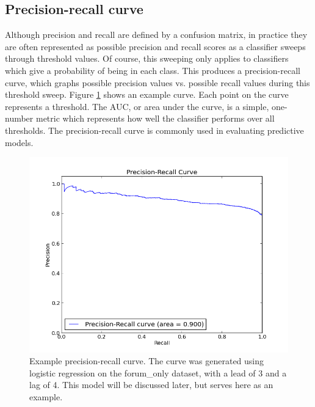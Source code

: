\subsection{Precision-recall curve}
Although precision and recall are defined by a confusion matrix, in practice they are often represented as possible precision and recall scores as a classifier sweeps through threshold values. Of course, this sweeping only applies to classifiers which give a probability of being in each class. This produces a precision-recall curve, which graphs possible precision values vs. possible recall values during this threshold sweep. Figure \ref{fig:example_precision_recall} shows an example curve. Each point on the curve represents a threshold. The AUC, or area under the curve, is a simple, one-number metric which represents how well the classifier performs over all thresholds. The precision-recall curve is commonly used in evaluating predictive models.

\begin{figure}[ht!]
  \caption{Example precision-recall curve. The curve was generated using logistic regression on the forum\_only dataset, with a lead of 3 and a lag of 4. This model will be discussed later, but serves here as an example.}\label{fig:example_precision_recall}
  \centering
    \includegraphics[width=1.0\textwidth]{figures/example_precision_recall.png}
\end{figure}

